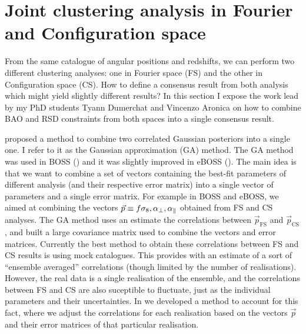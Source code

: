 \section{Joint clustering analysis in Fourier and Configuration space}
\label{galaxies:joint}

From the same catalogue of angular positions and redshifts, we can perform 
two different clustering analyses: one in Fourier space (FS) and the other in 
Configuration space (CS). How to define a consensus result from both analysis 
which might yield slightly different results? In this section I expose the work 
lead by my PhD students Tyann Dumerchat and Vincenzo Aronica on how to combine  
BAO and RSD constraints from both spaces into a single consensus result. 

\cite{sanchezClusteringGalaxiesCompleted2017a} proposed a method to combine
two correlated Gaussian posteriors into a single one. I refer to it as the 
Gaussian approximation (GA) method. The GA method was used in 
BOSS (\cite{alamClusteringGalaxiesCompleted2017}) and it was slightly improved 
in eBOSS (\cite{bautistaCompletedSDSSIVExtended2020}). 
The main idea is that we want to combine a set of vectors containing the best-fit 
parameters of different analysis (and their respective error matrix) into a single vector 
of parameters and a single error matrix. 
For example in BOSS and eBOSS, we aimed at combining 
the vectors $\vec{p} \equiv {f\sigma_8, {\alpha_\perp}, {\alpha_\parallel}}$ obtained from FS and CS analyses. 
The GA method uses an estimate the correlations between $\vec{p}_\text{FS}$ and $\vec{p}_\text{CS}$,
and built a large covariance matrix used to combine the vectors and error matrices. 
Currently the best method to obtain these correlations between FS and CS results is using mock catalogues.
This provides with an estimate of a sort of ``ensemble averaged'' correlations (though limited by the 
number of realisations). However, the real data is a single realisation of the ensemble, and 
the correlations between FS and CS are also suceptible to fluctuate, just as the individual parameters 
and their uncertainties. In \cite{bautistaCompletedSDSSIVExtended2020} we developed 
a method to account for this fact, where we adjust the correlations for each realisation based on 
the vectors $\vec{p}$ and their error matrices of that particular realisation. 

